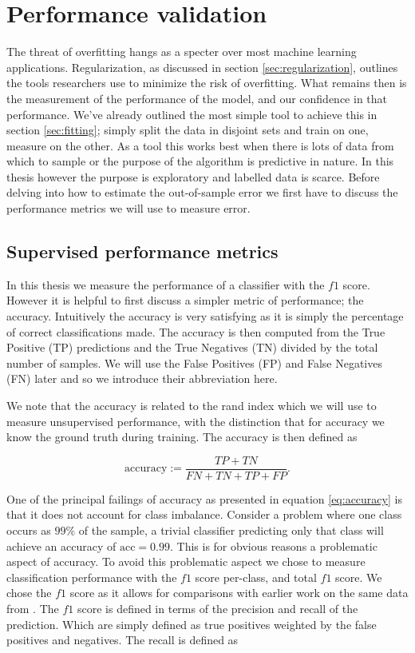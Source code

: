 
\section{Performance validation}\label{sec:performance_val}

The threat of overfitting hangs as a specter over most machine learning applications. Regularization, as discussed in section \ref{sec:regularization}, outlines the tools researchers use to minimize the risk of overfitting. What remains then is the measurement of the performance of the model, and our confidence in that performance. We've already outlined the most simple tool to achieve this in section \ref{sec:fitting}; simply split the data in disjoint sets and train on one, measure on the other. As a tool this works best when there is lots of data from which to sample or the purpose of the algorithm is predictive in nature. In this thesis however the purpose is exploratory and labelled data is scarce. Before delving into how to estimate the out-of-sample error we first have to discuss the performance metrics we will use to measure error. 

\subsection{Supervised performance metrics}\label{sec:supervised_perf}

In this thesis we measure the performance of a classifier with the $f1$ score. However it is helpful to first discuss a simpler metric of performance; the accuracy. Intuitively the accuracy is very satisfying as it is simply the percentage of correct classifications made. The accuracy is then computed from the True Positive (TP) predictions and the True Negatives (TN) divided by the total number of samples. We will use the False Positives (FP) and False Negatives (FN) later and so we introduce their abbreviation here.

We note that the accuracy is related to the rand index which we will use to measure unsupervised performance, with the distinction that for accuracy we know the ground truth during training. The accuracy is then defined as 

\begin{equation}\label{eq:accuracy}
\text{accuracy} := \frac{TP + TN}{FN+ TN + TP+FP}.
\end{equation}

\noindent One of the principal failings of accuracy as presented in equation \ref{eq:accuracy} is that it does not account for class imbalance. Consider a problem where one class occurs as $99\%$ of the sample, a trivial classifier predicting only that class will achieve an accuracy of $\text{acc}=0.99$. This is for obvious reasons a problematic aspect of accuracy. To avoid this problematic aspect we chose to measure classification performance with the $f1$ score per-class, and total $f1$ score. We chose the $f1$ score as it allows for comparisons with earlier work on the same data from \citet{Kuchera2019}. The $f1$ score is defined in terms of the precision and recall of the prediction. Which are simply defined as true positives weighted by the false positives and negatives. The recall is defined as

